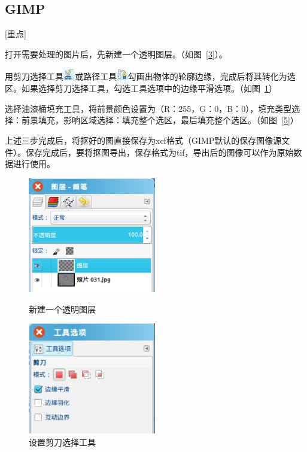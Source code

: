 \documentclass[12pt]{article}
\begin{document}
\subsection*{GIMP}[\textcolor{ZHY}{重点}]
\begin{enumerate*}
\item 打开需要处理的图片后，先新建一个透明图层。（如图~\ref{3}）。
\item 用剪刀选择工具\includegraphics[height=0.2in]{jiandao.png}或路径工具\includegraphics[height=0.2in]{lujing.png}勾画出物体的轮廓边缘，完成后将其转化为选区。如果选择剪刀选择工具，勾选工具选项中的边缘平滑选项。（如图~\ref{4}）%
\item 选择油漆桶填充工具，将前景颜色设置为（R：255，G：0，B：0），填充类型选择：前景填充，影响区域选择：填充整个选区，最后填充整个选区。（如图~\ref{5}）%
\item 上述三步完成后，将抠好的图直接保存为xcf格式（GIMP默认的保存图像源文件）。保存完成后，要将抠图导出，保存格式为tif，导出后的图像可以作为原始数据进行使用。
\end{enumerate*}


\begin{figure}[htbp]
\begin{minipage}{0.5\textwidth}
\centering
\includegraphics[width=2.2in]{tuceng.png}
\caption{新建一个透明图层}
\label{3}
\end{minipage}
\begin{minipage}{0.5\textwidth}
\centering
\includegraphics[width=2.2in]{bianyuan.png}
\caption{设置剪刀选择工具}
\label{4}
\end{minipage}
\end{figure}
\end{document}
